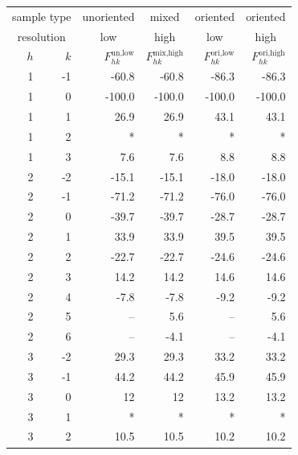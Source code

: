\begin{table}[htbp]
  \centering
  \begin{tabular}{rrrrrr}
    \hline
    \multicolumn{2}{c}{sample type} & \multicolumn{1}{c}{unoriented} & \multicolumn{1}{c}{mixed} & \multicolumn{1}{c}{oriented} & \multicolumn{1}{c}{oriented} \\
    \multicolumn{2}{c}{resolution} & \multicolumn{1}{c}{low} & \multicolumn{1}{c}{high} & \multicolumn{1}{c}{low} & \multicolumn{1}{c}{high} \\
    \hline
    $h$ & $k$ & \multicolumn{1}{r}{$F_{hk}^\text{un,low}$} & \multicolumn{1}{r}{$F_{hk}^\text{mix,high}$} & \multicolumn{1}{r}{$F_{hk}^\text{ori,low}$} & \multicolumn{1}{r}{$F_{hk}^\text{ori,high}$} \\
    \hline    
    1      & -1     & -60.8  & -60.8  & -86.3  & -86.3  \\
    1      & 0      & -100.0 & -100.0 & -100.0 & -100.0 \\
    1      & 1      & 26.9   & 26.9   & 43.1   & 43.1   \\
    1      & 2      & *      & *      & *      & *      \\
    1      & 3      & 7.6    & 7.6    & 8.8    & 8.8    \\
    2      & -2     & -15.1  & -15.1  & -18.0  & -18.0  \\
    2      & -1     & -71.2  & -71.2  & -76.0  & -76.0  \\
    2      & 0      & -39.7  & -39.7  & -28.7  & -28.7  \\
    2      & 1      & 33.9   & 33.9   & 39.5   & 39.5   \\
    2      & 2      & -22.7  & -22.7  & -24.6  & -24.6  \\
    2      & 3      & 14.2   & 14.2   & 14.6   & 14.6   \\
    2      & 4      & -7.8   & -7.8   & -9.2   & -9.2   \\
    2      & 5      & --     & 5.6    & --     & 5.6    \\
    2      & 6      & --     & -4.1   & --     & -4.1   \\
    3      & -2     & 29.3   & 29.3   & 33.2   & 33.2   \\
    3      & -1     & 44.2   & 44.2   & 45.9   & 45.9   \\
    3      & 0      & 12     & 12     & 13.2   & 13.2   \\
    3      & 1      & *      & *      & *      & *      \\
    3      & 2      & 10.5   & 10.5   & 10.2   & 10.2   \\

\end{tabular}
\end{table}
